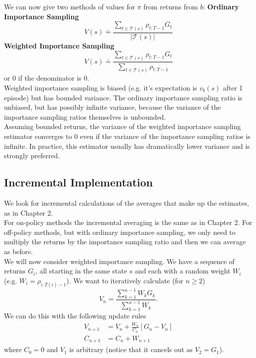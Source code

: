 We can now give two methods of values for $\pi$ from returns from $b$:
{\bfseries{Ordinary Importance Sampling}}
\begin{equation}
    V(s) \doteq \frac{\sum_{t\in \mathcal{T}(s)} \rho_{t:T-1}G_t}{|\mathcal{T}(s)|}
\end{equation}
{\bfseries{Weighted Importance Sampling}}
\begin{equation}
    V(s) \doteq \frac{\sum_{t\in \mathcal{T}(s)} \rho_{t:T-1}G_t}{\sum_{t\in \mathcal{T}(s)} \rho_{t:T-1}}
\end{equation}
or 0 if the denominator is 0.\\

Weighted importance sampling is biased (e.g. it's expectation is $v_b(s)$ after 1 episode) but has bounded variance. The ordinary importance sampling ratio is unbiased, but has possibly infinite variance, because the variance of the importance sampling ratios themselves is unbounded.\\

Assuming bounded returns, the variance of the weighted importance sampling estimator converges to 0 even if the variance of the importance sampling ratios is infinite. In practice, this estimator usually has dramatically lower variance and is strongly preferred.

\subsection{Incremental Implementation}
We look for incremental calculations of the averages that make up the estimates, as in Chapter 2.\\

For on-policy methods the incremental averaging is the same as in Chapter 2. For off-policy methods, but with ordinary importance sampling, we only need to multiply the returns by the importance sampling ratio and then we can average as before.\\

We will now consider weighted importance sampling. We have a sequence of returns $G_i$, all starting in the same state $s$ and each with a random weight $W_i$ (e.g. $W_i = \rho_{i:T(i)-1}$). We want to iteratively calculate (for $n \geq 2$)
\[
    V_n = \frac{\sum_{k=1}^{n-1}W_kG_k}{\sum_{k=1}^{n-1}W_k}.
\]
We can do this with the following update rules
\begin{align}
    V_{n+1} &= V_n + \frac{W_n}{C_n}[G_n - V_n]\\
    C_{n+1} &= C_n + W_{n+1}
\end{align}
where $C_0 = 0$ and $V_1$ is arbitrary (notice that it cancels out as $V_2 = G_1$).\\

